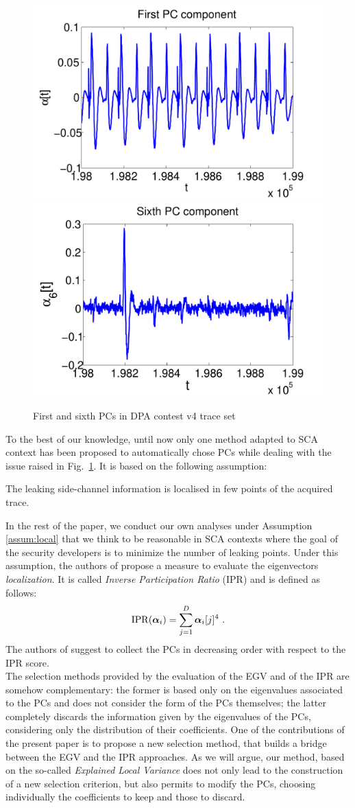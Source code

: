 \begin{figure}
\includegraphics[width=.45\textwidth]{figures/DPAcontestPC1.pdf} 
\includegraphics[width=.45\textwidth]{figures/DPAcontestPC6.pdf} 
\caption{First and sixth PCs in DPA contest v4 trace set}\label{fig:DPAcontest}
\end{figure}
To the best of our knowledge, until now only one method adapted to SCA context has been proposed to automatically chose PCs \cite{SCAclassProbl} while dealing with the issue raised in Fig.~\ref{fig:DPAcontest}. It is based on the following assumption:
\begin{assumption}\label{assum:local}
The leaking side-channel information is localised in few points of the acquired trace.
\end{assumption}
In the rest of the paper, we conduct our own analyses under Assumption \ref{assum:local} that we think to be reasonable in SCA contexts where the goal of the security developers is to minimize the number of leaking points.
Under this assumption, the authors of \cite{SCAclassProbl} propose a measure to evaluate the eigenvectors {\em localization}. It is called {\em Inverse Participation Ratio} (IPR) and is defined as follows:
\begin{equation}
\mathrm{IPR}(\boldsymbol\alpha_i) = \sum_{j=1}^D \boldsymbol\alpha_i[j]^4 \mbox{ .}
\end{equation}
The authors of \cite{SCAclassProbl} suggest to collect the PCs in decreasing order with respect to the IPR score.\\

The selection methods provided by the evaluation of the EGV and of the IPR are somehow complementary: the former is based only on the eigenvalues associated to the PCs and does not consider the form of the PCs themselves; the latter completely discards the information given by the eigenvalues of the PCs, considering only the distribution of their coefficients. One of the contributions of the present paper is to propose a new selection method, that builds a bridge between the EGV and the IPR approaches. As we will argue, our method, based on the so-called {\em Explained Local Variance} does not only lead to the construction of a new selection criterion, but also permits  to modify the PCs, choosing individually the coefficients to keep and those to discard. 

